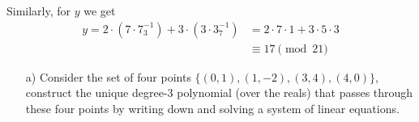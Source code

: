 \documentclass[]{article}
\begin{document}
\begin{qunlist}
{{\begin{enumerate}
Similarly, for $y$ we get
\begin{align*}
y = 2 \cdot (7 \cdot 7^{-1}_3) + 3 \cdot( 3 \cdot 3^{-1}_7) &= 2 \cdot 7 \cdot 1 + 3 \cdot 5 \cdot 3 \\
&\equiv \boxed{17 \pmod{21}}
\end{align*}
  \end{enumerate}
}}\fi


\begin{itemize}
\qpart
\item[a)] Consider the set of four points $\{(0,1), (1,-2), (3,4), (4,0)\}$, construct the unique degree-$3$ polynomial (over the reals) that passes through these four points by writing down and solving a system of linear equations.



\end{itemize}
\end{qunlist}
\end{document}
